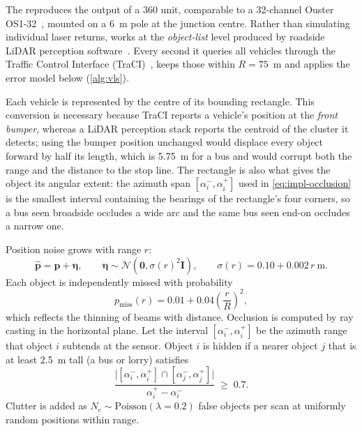 The \vls{} reproduces the output of a 360\textdegree{} unit,
comparable to a 32-channel Ouster OS1-32~\cite{ouster_os1}, mounted on a 6~m pole at the junction centre. Rather than simulating individual laser returns, \vls{} works at the \emph{object-list} level produced by roadside LiDAR perception software~\cite{zhao2019lidar,lv2019lidar}. Every second it queries all vehicles
through the Traffic Control Interface (TraCI)~\cite{wegener2008traci}, keeps those within
$R = 75$~m and applies the error model below (\cref{alg:vls}).

Each vehicle is represented by the centre of its bounding rectangle. This conversion is necessary because
TraCI reports a vehicle's position at the \emph{front bumper}, whereas a LiDAR perception stack reports the
centroid of the cluster it detects; using the bumper position unchanged would displace every object forward by
half its length, which is 5.75~m for a bus and would corrupt both the range and the distance to the stop line.
The rectangle is also what gives the object its angular extent: the azimuth span $[\alpha_i^-,\alpha_i^+]$ used
in \cref{eq:impl-occlusion} is the smallest interval containing the bearings of the rectangle's four corners,
so a bus seen broadside occludes a wide arc and the same bus seen end-on occludes a narrow one.

Position noise grows with range $r$:
\begin{equation}
  \hat{\mathbf{p}} = \mathbf{p} + \boldsymbol{\eta}, \qquad
  \boldsymbol{\eta} \sim \mathcal{N}\!\left(\mathbf{0}, \sigma(r)^2\mathbf{I}\right), \qquad
  \sigma(r) = 0.10 + 0.002\,r~\text{m}.
  \label{eq:impl-noise}
\end{equation}
Each object is independently missed with probability
\begin{equation}
  p_{\text{miss}}(r) = 0.01 + 0.04\left(\frac{r}{R}\right)^{2},
  \label{eq:impl-dropout}
\end{equation}
which reflects the thinning of beams with distance. Occlusion is computed by ray casting in the
horizontal plane. Let the interval $[\alpha_i^-, \alpha_i^+]$ be the azimuth range that object $i$
subtends at the sensor. Object $i$ is hidden if a nearer object $j$ that is at least 2.5~m tall
(a bus or lorry) satisfies
\begin{equation}
  \frac{\big|[\alpha_i^-, \alpha_i^+] \cap [\alpha_j^-, \alpha_j^+]\big|}{\alpha_i^+ - \alpha_i^-} \;\geq\; 0.7 .
  \label{eq:impl-occlusion}
\end{equation}
 Clutter is
added as $N_c \sim \text{Poisson}(\lambda = 0.2)$ false objects per scan at uniformly random positions
within range.

